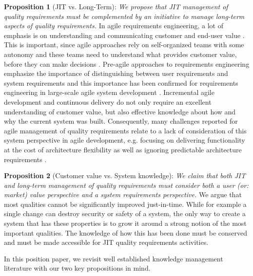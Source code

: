 \textbf{Proposition 1} (JIT vs. Long-Term): \emph{We propose that JIT management of quality requirements must be complemented by an initiative to manage long-term aspects of quality requirements.}
%
%
In agile requirements engineering, a lot of emphasis is on understanding and communicating customer and end-user value \cite{Alahyari2016}.
This is important, since agile approaches rely on self-organized teams with some autonomy \cite{Meyer2014} and these teams need to understand what provides customer value, before they can make decisions \cite{Kasauli2017}.
Pre-agile approaches to requirements engineering emphasize the importance of distinguishing between user requirements and system requirements \cite{Sommerville2006} and this importance has been confirmed for requirements engineering in large-scale agile system development \cite{Kasauli2017a}. Incremental agile development and continuous delivery do not only require an excellent understanding of customer value, but also effective knowledge about how and why the current system was built. 
Consequently, many challenges reported for agile management of quality requirements relate to a lack of consideration of this system perspective in agile development, e.g. %
{focusing on delivering functionality at the cost of architecture flexibility} as well as %
{ignoring predictable architecture requirements} \cite{Alsaqaf2017}. 

\textbf{Proposition 2} (Customer value vs. System knowledge): \emph{ We claim that both JIT and long-term management of quality requirements must consider both a user (or: market) value perspective and a system requirements perspective.}
%
We argue that most qualities cannot be significantly improved just-in-time. 
While for example a single change can destroy security or safety of a system, the only way to create a system that has these properties is to grow it around a strong notion of the most important qualities. 
The knowledge of how this has been done must be conserved and must be made accessible for JIT quality requirements activities.

In this position paper, we revisit well established knowledge management literature with our two key propositions in mind.
 


%
